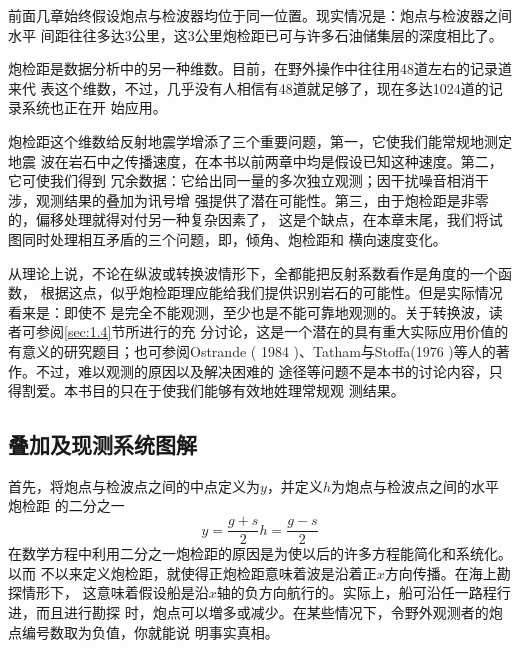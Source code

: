 前面几章始终假设炮点与检波器均位于同一位置。现实情况是：炮点与检波器之间水平
间距往往多达3公里，这3公里炮检距已可与许多石油储集层的深度相比了。

炮检距是数据分析中的另一种维数。目前，在野外操作中往往用48道左右的记录道来代
表这个维数，不过，几乎没有人相信有48道就足够了，现在多达1024道的记录系统也正在开
始应用。

炮检距这个维数给反射地震学增添了三个重要问题，第一，它使我们能常规地测定地震
波在岩石中之传播速度，在本书以前两章中均是假设已知这种速度。第二，它可使我们得到
冗余数据：它给出同一量的多次独立观测；因干扰噪音相消干涉，观测结果的叠加为讯号增
强提供了潜在可能性。第三，由于炮检距是非零的，偏移处理就得对付另一种复杂因素了，
这是个缺点，在本章末尾，我们将试图同时处理相互矛盾的三个问题，即，倾角、炮检距和
横向速度变化。

从理论上说，不论在纵波或转换波情形下，全都能把反射系数看作是角度的一个函数，
根据这点，似乎炮检距理应能给我们提供识别岩石的可能性。但是实际情况看来是：即使不
是完全不能观测，至少也是不能可靠地观测的。关于转换波，读者可参阅\ref{sec:1.4}节所进行的充
分讨论，这是一个潜在的具有重大实际应用价值的有意义的研究题目；也可参阅Ostrande
( 1984 )、Tatham与Stoffa(1976
)等人的著作。不过，难以观测的原因以及解决困难的
途径等问题不是本书的讨论内容，只得割爱。本书目的只在于使我们能够有效地姓理常规观
测结果。

\subsection{叠加及现测系统图解}
\label{sec:3.0.1}

首先，将炮点与检波点之间的中点定义为$y$，并定义$h$为炮点与检波点之间的水平炮检距
的二分之一
\begin{subequations}
\begin{equation}
y=\frac{g+s}{2}
\label{eq:ex3.0.1a}
\end{equation}
\begin{equation}
h=\frac{g-s}{2}
\label{eq:ex3.0.1b}
\end{equation}
\label{eq:ex3.0.1}
\end{subequations}
在数学方程中利用二分之一炮检距的原因是为使以后的许多方程能简化和系统化。以而
不以来定义炮检距，就使得正炮检距意味着波是沿着正$x$方向传播。在海上勘探情形下，
这意味着假设船是沿$x$轴的负方向航行的。实际上，船可沿任一路程行进，而且进行勘探
时，炮点可以増多或减少。在某些情况下，令野外观测者的炮点编号数取为负值，你就能说
明事实真相。

